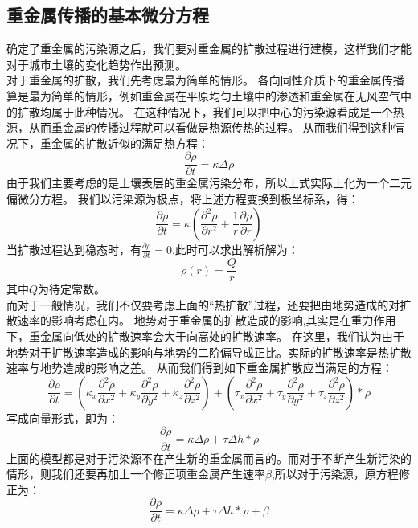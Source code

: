 \documentclass[a4paper]{article}
\begin{document}
\subsection{重金属传播的基本微分方程}
确定了重金属的污染源之后，我们要对重金属的扩散过程进行建模，这样我们才能对于城市土壤的变化趋势作出预测。  \\
\indent 对于重金属的扩散，我们先考虑最为简单的情形。
各向同性介质下的重金属传播算是最为简单的情形，例如重金属在平原均匀土壤中的渗透和重金属在无风空气中的扩散均属于此种情况。
在这种情况下，我们可以把中心的污染源看成是一个热源，从而重金属的传播过程就可以看做是热源传热的过程。
从而我们得到这种情况下，重金属的扩散近似的满足热方程：
\begin{equation}
\frac{\partial \rho}{\partial t} = \kappa \Delta \rho
\end{equation}
由于我们主要考虑的是土壤表层的重金属污染分布，所以上式实际上化为一个二元偏微分方程。
我们以污染源为极点，将上述方程变换到极坐标系，得：
\begin{equation}
\frac{\partial \rho}{\partial t} = \kappa(\frac{\partial^2 \rho}{\partial r^2}+\frac{1}{r}\frac{\partial \rho}{\partial r})
\end{equation}
当扩散过程达到稳态时，有$\frac{\partial \rho}{\partial t} = 0$,此时可以求出解析解为：
\begin{equation}
\rho(r) = \frac{Q}{r}
\end{equation}
其中$Q$为待定常数。\\

\indent 而对于一般情况，我们不仅要考虑上面的“热扩散”过程，还要把由地势造成的对扩散速率的影响考虑在内。
地势对于重金属的扩散造成的影响,其实是在重力作用下，重金属向低处的扩散速率会大于向高处的扩散速率。
在这里，我们认为由于地势对于扩散速率造成的影响与地势的二阶偏导成正比。实际的扩散速率是热扩散速率与地势造成的影响之差。
从而我们得到如下重金属扩散应当满足的方程：
\begin{equation}
\frac{\partial \rho}{\partial t} 
= (\kappa_x\frac{\partial^2 \rho}{\partial x^2}+\kappa_y\frac{\partial^2 \rho}{\partial y^2}+\kappa_z\frac{\partial^2 \rho}{\partial z^2})
+( \tau_x\frac{\partial^2 \rho}{\partial x^2}+\tau_y\frac{\partial^2 \rho}{\partial y^2}+\tau_z\frac{\partial^2 \rho}{\partial z^2})*\rho
\end{equation}
写成向量形式，即为：
\begin{equation}
\frac{\partial \rho}{\partial t} = \kappa \Delta \rho + \tau \Delta h *\rho
\end{equation}
上面的模型都是对于污染源不在产生新的重金属而言的。而对于不断产生新污染的情形，则我们还要再加上一个修正项重金属产生速率$\beta$,所以对于污染源，原方程修正为：
\begin{equation}
\frac{\partial \rho}{\partial t} = \kappa \Delta \rho + \tau \Delta h *\rho + \beta
\end{equation}
\end{document}
